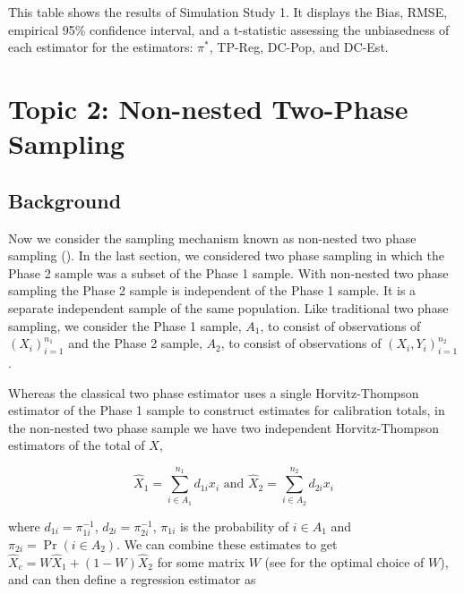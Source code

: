 \documentclass[12pt]{article}
\begin{document}
\begin{table}[ht!]
  \centering

\caption{This table shows the results of Simulation Study 1. It displays the
Bias, RMSE, empirical 95\% confidence interval, and a t-statistic assessing the
unbiasedness of each estimator for the estimators: $\pi^*$, TP-Reg, DC-Pop, and
DC-Est.}
\label{tab:tpdc-mean}
\end{table}

\section{Topic 2: Non-nested Two-Phase Sampling}

\subsection{Background}

Now we consider the sampling mechanism known as non-nested two phase sampling 
(\cite{hidiroglou2001double}). In the last section, we considered two phase sampling
in which the Phase 2 sample was a subset of the Phase 1 sample. With non-nested
two phase sampling the Phase 2 sample is independent of the Phase 1 sample. It
is a separate independent sample of the same population. Like traditional two
phase sampling, we consider the Phase 1 sample, $A_1$, to consist of
observations of $(X_i)_{i = 1}^{n_1}$ and the Phase 2 sample, $A_2$, to consist
of observations of $(X_i, Y_i)_{i = 1}^{n_2}$. 

Whereas the classical two phase estimator uses a single Horvitz-Thompson
estimator of the Phase 1 sample to construct estimates for calibration totals,
in the non-nested two phase sample we have two independent Horvitz-Thompson
estimators of the total of $X$,

$$\hat X_1 = \sum_{i \in A_1}^{n_1} d_{1i} x_i \text{ and } 
\hat X_2 = \sum_{i \in A_2}^{n_2} d_{2i} x_i $$

where $d_{1i} = \pi_{1i}^{-1}$, $d_{2i} = \pi_{2i}^{-1}$, $\pi_{1i}$ is the
probability of $i \in A_1$ and $\pi_{2i} = \Pr(i \in A_2)$. 
We can combine these estimates to get
$\hat X_c = W \hat X_1 + (1 - W)\hat X_2$ for some matrix $W$ (see
\cite{merkouris2004combining} for the optimal choice of $W$), and can then define
a regression estimator as
\end{document}
